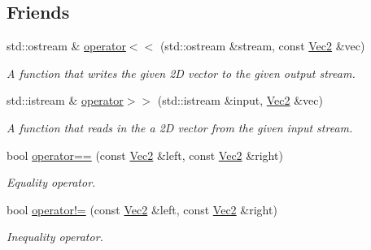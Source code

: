 \subsection*{Friends}
\begin{DoxyCompactItemize}
\item 
std\+::ostream \& \hyperlink{classgfxmath_1_1_vec2_a4318103522da957a7fea3f3454f663fa}{operator$<$$<$} (std\+::ostream \&stream, const \hyperlink{classgfxmath_1_1_vec2}{Vec2} \&vec)
\begin{DoxyCompactList}\small\item\em A function that writes the given 2\+D vector to the given output stream. \end{DoxyCompactList}\item 
std\+::istream \& \hyperlink{classgfxmath_1_1_vec2_ae05b41fed2d1147f95d2e43e75463fa4}{operator$>$$>$} (std\+::istream \&input, \hyperlink{classgfxmath_1_1_vec2}{Vec2} \&vec)
\begin{DoxyCompactList}\small\item\em A function that reads in the a 2\+D vector from the given input stream. \end{DoxyCompactList}\item 
bool \hyperlink{classgfxmath_1_1_vec2_abed4a0c0a66b1b50c31c8448ddb2384d}{operator==} (const \hyperlink{classgfxmath_1_1_vec2}{Vec2} \&left, const \hyperlink{classgfxmath_1_1_vec2}{Vec2} \&right)
\begin{DoxyCompactList}\small\item\em Equality operator. \end{DoxyCompactList}\item 
bool \hyperlink{classgfxmath_1_1_vec2_a95f55509aeacabec75d0a5289c57cfcc}{operator!=} (const \hyperlink{classgfxmath_1_1_vec2}{Vec2} \&left, const \hyperlink{classgfxmath_1_1_vec2}{Vec2} \&right)
\begin{DoxyCompactList}\small\item\em Inequality operator. \end{DoxyCompactList}\end{DoxyCompactItemize}
